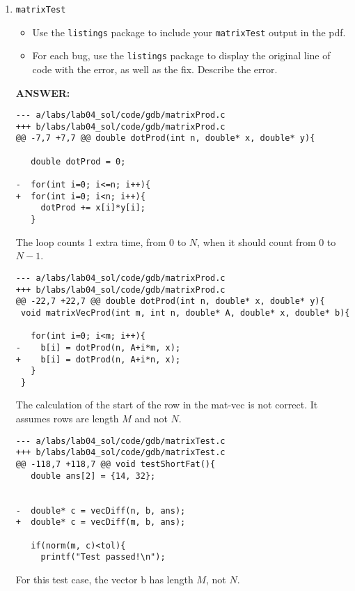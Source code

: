 \begin{enumerate}
    \item \texttt{matrixTest}
    \begin{itemize}
        \item Use the \texttt{listings} package to include your \texttt{matrixTest} output in the pdf.
        \item For each bug, use the \texttt{listings} package to display the original line of code with the error, as well as the fix.  Describe the error.            
    \end{itemize}
    \textbf{ANSWER:} %

    
\newpage 

\begin{lstlisting}[frame=single]
--- a/labs/lab04_sol/code/gdb/matrixProd.c
+++ b/labs/lab04_sol/code/gdb/matrixProd.c
@@ -7,7 +7,7 @@ double dotProd(int n, double* x, double* y){
 
   double dotProd = 0;
 
-  for(int i=0; i<=n; i++){
+  for(int i=0; i<n; i++){
     dotProd += x[i]*y[i];
   }
\end{lstlisting}
The loop counts 1 extra time, from 0 to $N$, when it should count from 0 to $N-1$.


\begin{lstlisting}[frame=single]
--- a/labs/lab04_sol/code/gdb/matrixProd.c
+++ b/labs/lab04_sol/code/gdb/matrixProd.c
@@ -22,7 +22,7 @@ double dotProd(int n, double* x, double* y){
 void matrixVecProd(int m, int n, double* A, double* x, double* b){
 
   for(int i=0; i<m; i++){
-    b[i] = dotProd(n, A+i*m, x);
+    b[i] = dotProd(n, A+i*n, x);
   }
 }
\end{lstlisting}
The calculation of the start of the row in the mat-vec is not correct.  It assumes rows are length $M$ and not $N$.

\begin{lstlisting}[frame=single]
--- a/labs/lab04_sol/code/gdb/matrixTest.c
+++ b/labs/lab04_sol/code/gdb/matrixTest.c
@@ -118,7 +118,7 @@ void testShortFat(){
   double ans[2] = {14, 32};
 
   
-  double* c = vecDiff(n, b, ans);
+  double* c = vecDiff(m, b, ans);

   if(norm(m, c)<tol){ 
     printf("Test passed!\n");
\end{lstlisting}
For this test case, the vector b has length $M$, not $N$.
   

\end{enumerate}
